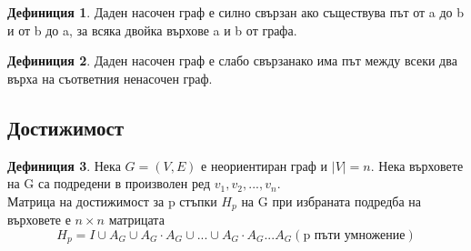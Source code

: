 \documentclass[fleqn, 12pt]{article}
\theoremstyle{definition}
\newtheorem{definition}{Дефиниция}[subsection]
\begin{document}
\begin{definition}
Даден насочен граф е силно свързан ако съществува път от a до b и от b до a, за всяка двойка върхове a и b от графа.
\end{definition}

\begin{definition}
Даден насочен граф е слабо свързанако има път между всеки два върха на съответния ненасочен граф.
\end{definition}

\subsection{Достижимост}
\begin{definition}
Нека $G = (V, E)$ е неориентиран граф и $\vert V \vert = n$. Нека върховете на G са подредени в произволен ред $v_1, v_2, ..., v_n$. \\
Матрица на достижимост за p стъпки $H_p$ на G при избраната подредба на върховете е $n\times n$ матрицата
$$H_p = I \cup A_G \cup A_G \cdot A_G \cup ... \cup A_G \cdot A_G ... A_G (\text{p пъти умножение})$$
\end{definition}
\end{document}
